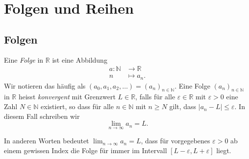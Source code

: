 \documentclass[../main.tex]{subfiles}
\begin{document}
\chapter{Folgen und Reihen}
\section{Folgen}
\begin{definition}
	Eine \emph{Folge} in $\mathbb{R}$ ist eine Abbildung
  \begin{align*}
    a \colon \mathbb{N} & \to \mathbb{R} \\
    n & \mapsto a_n.
  \end{align*}
  Wir notieren das häufig als 
  $(a_0, a_1, a_2, \dots) = {(a_n)}_{n \in \mathbb{N}}$.
	Eine Folge ${(a_n)}_{n \in \mathbb{N}}$ in $\mathbb{R}$
	heisst \emph{konvergent} mit Grenzwert
	$L \in \mathbb{R}$, falls für alle
	$\varepsilon \in \mathbb{R}$ mit $\varepsilon > 0$
	eine Zahl $N \in \mathbb{N}$ existiert,
	so dass für alle $n\in \mathbb{N}$ 
	mit $n \geq N$ gilt, dass
	$|a_n - L| \leq \varepsilon$. In diesem Fall schreiben wir
	\[
	  \lim_{n \to \infty} a_n = L.
	\]
\end{definition}

In anderen Worten bedeutet $\lim_{n \to \infty} a_n = L$, dass
für vorgegebenes $\varepsilon > 0$
ab einem gewissen Index die Folge für immer im Intervall
$[L- \varepsilon, L + \varepsilon]$ liegt.
\end{document}
